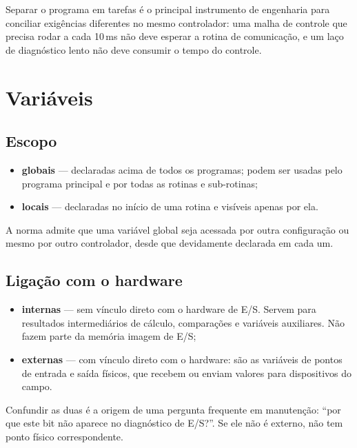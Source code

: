 Separar o programa em tarefas é o principal instrumento de engenharia para conciliar exigências
diferentes no mesmo controlador: uma malha de controle que precisa rodar a cada 10\,ms não deve
esperar a rotina de comunicação, e um laço de diagnóstico lento não deve consumir o tempo do
controle.


\section{Variáveis}

\subsection{Escopo}

\begin{itemize}
  \item \textbf{globais} --- declaradas acima de todos os programas; podem ser usadas pelo programa
        principal e por todas as rotinas e sub-rotinas;
  \item \textbf{locais} --- declaradas no início de uma rotina e visíveis apenas por ela.
\end{itemize}

A norma admite que uma variável global seja acessada por outra configuração ou mesmo por outro
controlador, desde que devidamente declarada em cada um.

\subsection{Ligação com o hardware}

\begin{itemize}
  \item \textbf{internas} --- sem vínculo direto com o hardware de E/S. Servem para resultados
        intermediários de cálculo, comparações e variáveis auxiliares. Não fazem parte da memória
        imagem de E/S;
  \item \textbf{externas} --- com vínculo direto com o hardware: são as variáveis de pontos de
        entrada e saída físicos, que recebem ou enviam valores para dispositivos do campo.
\end{itemize}

Confundir as duas é a origem de uma pergunta frequente em manutenção: ``por que este bit não aparece
no diagnóstico de E/S?''. Se ele não é externo, não tem ponto físico correspondente.

